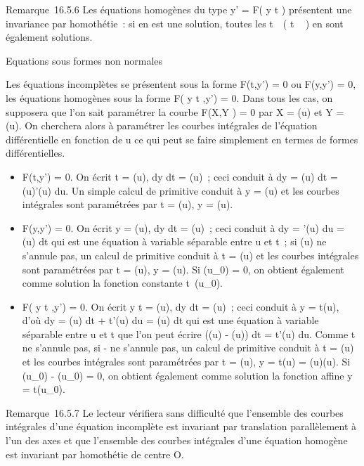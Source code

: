 \documentclass[]{article}
\begin{document}
Remarque~16.5.6 Les équations homogènes du type y' = F( y
\over t ) présentent une invariance par homothétie~: si
\phi en est une solution, toutes les
t\mapsto~\lambda~\phi\left ( t
\over \lambda~ \right ) en sont également
solutions.

Equations sous formes non normales

Les équations incomplètes se présentent sous la forme F(t,y') = 0 ou
F(y,y') = 0, les équations homogènes sous la forme F( y
\over t ,y') = 0. Dans tous les cas, on supposera que
l'on sait paramétrer la courbe F(X,Y ) = 0 par X = \phi(u) et Y = \psi(u). On
cherchera alors à paramétrer les courbes intégrales de l'équation
différentielle en fonction de u ce qui peut se faire simplement en
termes de formes différentielles.

\begin{itemize}
\itemsep1pt\parskip0pt
\item
  F(t,y') = 0. On écrit t = \phi(u),  dy \over dt =
  \psi(u)~; ceci conduit à dy = \psi(u) dt = \psi(u)\phi'(u) du. Un simple calcul de
  primitive conduit à y = \Psi(u) et les courbes intégrales sont
  paramétrées par t = \phi(u), y = \Psi(u).
\item
  F(y,y') = 0. On écrit y = \phi(u),  dy \over dt =
  \psi(u)~; ceci conduit à dy = \phi'(u) du = \psi(u) dt qui est une équation à
  variable séparable entre u et t~; si \psi(u) ne s'annule pas, un calcul
  de primitive conduit à t = \Phi(u) et les courbes intégrales sont
  paramétrées par t = \Phi(u), y = \psi(u). Si \phi(u_0) = 0, on obtient
  également comme solution la fonction constante
  t\mapsto~\phi(u_0).
\item
  F( y \over t ,y') = 0. On écrit  y
  \over t = \phi(u),  dy \over dt =
  \psi(u)~; ceci conduit à y = t\phi(u), d'où dy = \phi(u) dt + t\phi'(u) du = \psi(u)
  dt qui est une équation à variable séparable entre u et t que l'on
  peut écrire (\psi(u) - \phi(u)) dt = t\phi'(u) du. Comme t ne s'annule pas, si
  \psi - \phi ne s'annule pas, un calcul de primitive conduit à t = \Phi(u) et
  les courbes intégrales sont paramétrées par t = \Phi(u), y = t\psi(u) =
  \Phi(u)\psi(u). Si \psi(u_0) - \phi(u_0) = 0, on obtient
  également comme solution la fonction affine y = t\phi(u_0).
\end{itemize}

Remarque~16.5.7 Le lecteur vérifiera sans difficulté que l'ensemble des
courbes intégrales d'une équation incomplète est invariant par
translation parallèlement à l'un des axes et que l'ensemble des courbes
intégrales d'une équation homogène est invariant par homothétie de
centre O.
\end{document}
